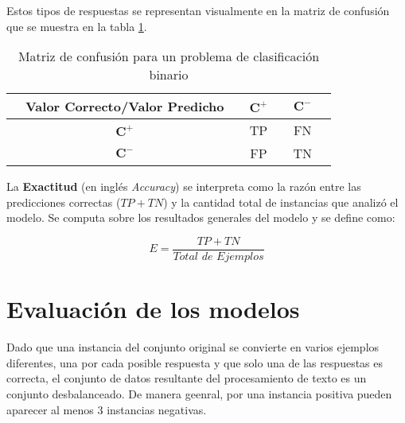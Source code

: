 Estos tipos de respuestas se representan visualmente en la matriz de confusión que se muestra en la tabla \ref{tab:confusion}.

\begin{table}[h!]
  \caption{Matriz de confusión para un problema de clasificación binario}
  \begin{center}
    \begin{tabular}{ccc|cc|cc}
        & Valor Correcto/Valor Predicho &    & $\mathbf{C}^{\boldsymbol{+}}$ & & $\mathbf{C}^{\boldsymbol{-}}$  \\
        \hline
        & $\mathbf{C}^{\boldsymbol{+}}$ &   & TP & & FN  \\
        \hline
        & $\mathbf{C}^{\boldsymbol{-}}$ &   & FP & & TN  \\
    \end{tabular}
  \end{center}
  \label{tab:confusion}
\end{table}

La \textbf{Exactitud} (en inglés \textit{Accuracy}) se interpreta como la razón entre las predicciones correctas ($TP + TN$) y la cantidad total de instancias que analizó el modelo. Se computa sobre los resultados generales del modelo y se define como:

\begin{equation}
  E = \frac{TP + TN}{\textit{Total de Ejemplos}}
\end{equation}


\section{Evaluación de los modelos}

Dado que una instancia del conjunto original se convierte en varios ejemplos diferentes, una por cada posible respuesta y que solo una de las respuestas es correcta, el conjunto de datos resultante del procesamiento de texto es un conjunto desbalanceado. De manera geenral, por una instancia positiva pueden aparecer al menos 3 instancias negativas.

